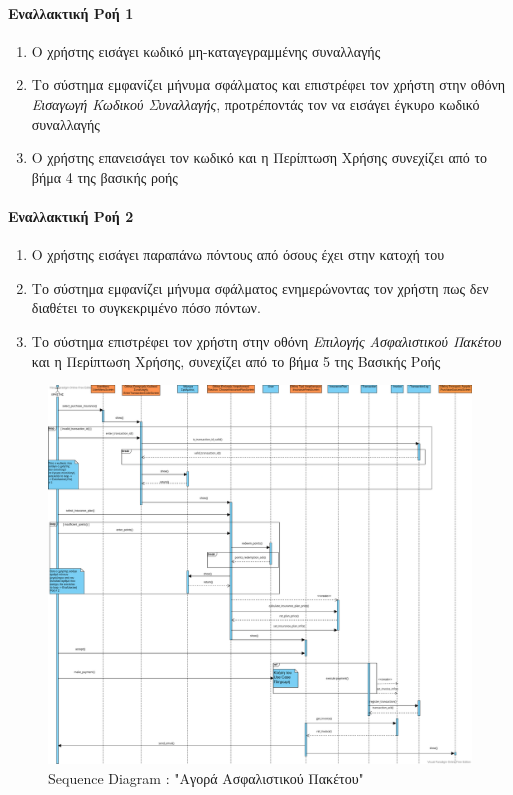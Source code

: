 \documentclass{../ol-softwaremanual}
\begin{document}
	\paragraph{Εναλλακτική Ροή 1 }
	
	\begin{enumerate}
		\item Ο χρήστης εισάγει κωδικό μη-καταγεγραμμένης συναλλαγής
		\item Το σύστημα εμφανίζει μήνυμα σφάλματος και επιστρέφει τον χρήστη στην  οθόνη \textit{Εισαγωγή Κωδικού Συναλλαγής}, προτρέποντάς τον να εισάγει έγκυρο κωδικό συναλλαγής
		\item Ο χρήστης επανεισάγει τον κωδικό και η Περίπτωση Χρήσης συνεχίζει από το βήμα 4 της βασικής ροής
	\end{enumerate}
	
	\paragraph{Εναλλακτική Ροή 2}
	\begin{enumerate}
		\item Ο χρήστης εισάγει παραπάνω πόντους από όσους έχει στην κατοχή του
		\item Το σύστημα εμφανίζει μήνυμα σφάλματος ενημερώνοντας τον χρήστη πως δεν διαθέτει το συγκεκριμένο πόσο πόντων.
		\item Το σύστημα επιστρέφει τον χρήστη στην οθόνη \textit{Επιλογής Ασφαλιστικού Πακέτου} και η Περίπτωση Χρήσης, συνεχίζει από το βήμα 5 της Βασικής Ροής
	\end{enumerate}
	
	
	\newpage
	
	\begin{figure}[htbp!]
		\centering
		\includegraphics[scale=0.25]{img/seq_purchase_insurance_plan.png}
		\caption{\en Sequence Diagram : "\gr Αγορά Ασφαλιστικού Πακέτου\en"\gr\protect\footnotemark[9]}
	\end{figure}
	
\end{document}
